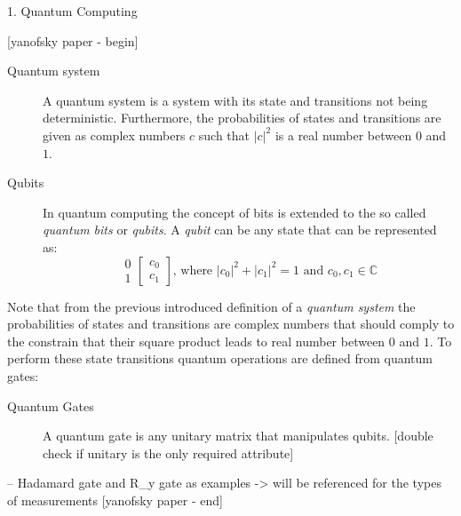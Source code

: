 1. Quantum Computing

[yanofsky paper - begin]
\begin{description}
  \item[Quantum system] A quantum system is a system with its state and transitions not being deterministic. Furthermore, the probabilities of states and transitions are given as complex numbers $c$ such that $|c|^2$ is a real number between $0$ and $1$.
  \item[Qubits] In quantum computing the concept of bits is extended to the so called \emph{quantum bits} or \emph{qubits}. A \emph{qubit} can be any state that can be represented as:
    \[
      \begin{matrix} 0 \\ 1 \end{matrix}
      \begin{bmatrix} c_0 \\ c_1 \end{bmatrix}
      \text{, where }
      |c_0|^2 + |c_1|^2 = 1 \text{ and } c_0, c_1 \in \mathbb{C}
    \]
\end{description}
Note that from the previous introduced definition of a \emph{quantum system} the probabilities of states and transitions are complex numbers that should comply to the constrain that their square product leads to real number between $0$ and $1$. To perform these state transitions quantum operations are defined from quantum gates:
\begin{description}
\item[Quantum Gates] A quantum gate is any unitary matrix that manipulates qubits. [double check if unitary is the only required attribute]
\end{description}

-- Hadamard gate and R_y gate as examples -> will be referenced for the types of measurements
[yanofsky paper - end]

